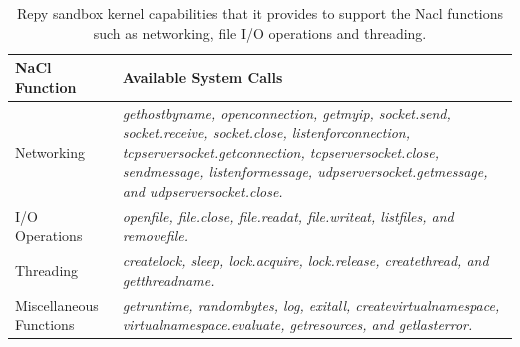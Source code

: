 \begin{table}
\centering
\caption {Repy sandbox kernel capabilities that it
provides to support the Nacl functions such as networking, file I/O operations and threading.}

  \begin{tabular}{ | p{2.5cm} | p{4.5cm} |}
  \hline
  \textbf{NaCl Function} & \textbf{Available System Calls}  \\ \hline
    
Networking & \emph{gethostbyname, openconnection, getmyip, socket.send, socket.receive, socket.close, 
listenforconnection, tcpserversocket.getconnection, tcpserversocket.close, sendmessage, listenformessage, 
udpserversocket.getmessage, and udpserversocket.close.} \\ \hline
 
I/O Operations & \emph{openfile, file.close, file.readat, file.writeat, listfiles, and removefile.} \\ \hline

Threading & \emph{createlock, sleep, lock.acquire, lock.release, createthread, and getthreadname.} \\ \hline   

Miscellaneous Functions & \emph{getruntime, randombytes, log, exitall, createvirtualnamespace, 
virtualnamespace.evaluate, getresources, and getlasterror.}  \\ \hline
    \end{tabular}
    \label{table:RepyKernel}
\end{table}

